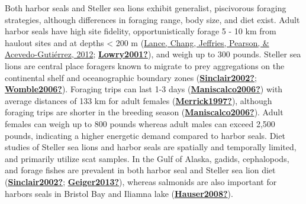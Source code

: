 \documentclass [11pt, proquest] {uwthesis}[2015/03/03]
\begin{document}
Both harbor seals and Steller sea lions exhibit generalist, piscivorous foraging strategies, although differences in foraging range, body size, and diet exist. Adult harbor seals have high site fidelity, opportunistically forage 5 - 10 km from haulout sites and at depths \textless{} 200 m (\protect\hyperlink{ref-Lance2012}{Lance, Chang, Jeffries, Pearson, \& Acevedo-Gutiérrez, 2012}; \protect\hyperlink{ref-Lowry2001}{\textbf{Lowry2001?}}), and weigh up to 300 pounds. Steller sea lions are central place foragers known to migrate to prey aggregations on the continental shelf and oceanographic boundary zones (\protect\hyperlink{ref-Sinclair2002}{\textbf{Sinclair2002?}}; \protect\hyperlink{ref-Womble2006}{\textbf{Womble2006?}}). Foraging trips can last 1-3 days (\protect\hyperlink{ref-Maniscalco2006}{\textbf{Maniscalco2006?}}) with average distances of 133 km for adult females (\protect\hyperlink{ref-Merrick1997}{\textbf{Merrick1997?}}), although foraging trips are shorter in the breeding season (\protect\hyperlink{ref-Maniscalco2006}{\textbf{Maniscalco2006?}}). Adult females can weigh up to 800 pounds whereas adult males can exceed 2,500 pounds, indicating a higher energetic demand compared to harbor seals. Diet studies of Steller sea lions and harbor seals are spatially and temporally limited, and primarily utilize scat samples. In the Gulf of Alaska, gadids, cephalopods, and forage fishes are prevalent in both harbor seal and Steller sea lion diet (\protect\hyperlink{ref-Sinclair2002}{\textbf{Sinclair2002?}}; \protect\hyperlink{ref-Geiger2013}{\textbf{Geiger2013?}}), whereas salmonids are also important for harbors seals in Bristol Bay and Iliamna lake (\protect\hyperlink{ref-Hauser2008}{\textbf{Hauser2008?}}).
\end{document}
